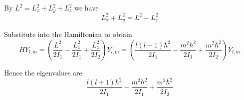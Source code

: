 


By $L^2=L_x^2+L_y^2+L_z^2$ we have
\begin{equation*}
L_x^2+L_y^2=L^2-L_z^2
\end{equation*}

Substitute into the Hamiltonian to obtain
\begin{equation*}
HY_{l,m}=\left(\frac{L^2}{2I_1}-\frac{L_z^2}{2I_1}+\frac{L_z^2}{2I_2}\right)Y_{l,m}
=\left(\frac{l(l+1)\hbar^2}{2I_1}-\frac{m^2\hbar^2}{2I_1}+\frac{m^2\hbar^2}{2I_2}\right)Y_{l,m}
\end{equation*}

Hence the eigenvalues are
\begin{equation*}
\frac{l(l+1)\hbar^2}{2I_1}-\frac{m^2\hbar^2}{2I_1}+\frac{m^2\hbar^2}{2I_2}
\end{equation*}


